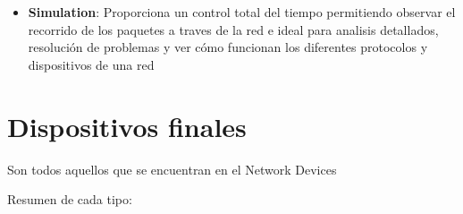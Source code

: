 \documentclass{article}
\begin{document}
\begin{itemize}
\begin{itemize}
            \item \textbf{Simulation}: Proporciona un control total del tiempo permitiendo observar el recorrido de los paquetes a traves de la red e ideal para analisis detallados, resolución de problemas y ver cómo funcionan los diferentes protocolos y dispositivos de una red 
            \end{itemize}
    
        \end{itemize}

    \section{Dispositivos finales}
        Son todos aquellos que se encuentran en el Network Devices
   
        Resumen de cada tipo:
\end{document}
